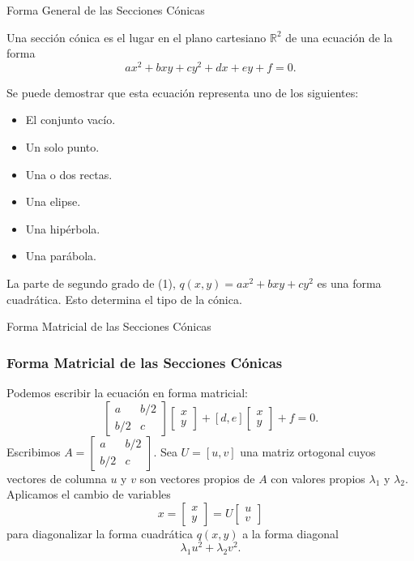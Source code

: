 \documentclass[xcolor={dvipsnames},aspectratio=169,10pt]{beamer}
\begin{document}
\begin{frame}{Forma General de las Secciones Cónicas}
  \begin{definition}
    Una sección cónica es el lugar en el plano cartesiano $\mathbb{R}^2$ de una ecuación de la forma
    \begin{equation*}
      ax^2 + bxy + cy^2 + dx + ey + f = 0. \tag{1}
    \end{equation*}
  \end{definition}
  Se puede demostrar que esta ecuación representa uno de los siguientes:
  \begin{itemize}
    \item El conjunto vacío.
    \item Un solo punto.
    \item Una o dos rectas.
    \item Una elipse.
    \item Una hipérbola.
    \item Una parábola.
\end{itemize}
  La parte de segundo grado de (1), $q(x, y) = ax^2 + bxy + cy^2$ es una forma cuadrática. Esto determina el tipo de la cónica.
\end{frame}

\begin{frame}{Forma Matricial de las Secciones Cónicas}
  \frametitle{Forma Matricial de las Secciones Cónicas}
  Podemos escribir la ecuación en forma matricial:
  \begin{equation*}
    [x, y] \begin{bmatrix} a & b/2 \\ b/2 & c \end{bmatrix} \begin{bmatrix} x \\ y \end{bmatrix} + [d, e] \begin{bmatrix} x \\ y \end{bmatrix} + f = 0.
  \end{equation*}
  Escribimos $A = \begin{bmatrix} a & b/2 \\ b/2 & c \end{bmatrix}$. Sea $U = [u, v]$ una matriz ortogonal cuyos vectores de columna $u$ y $v$ son vectores propios de $A$ con valores propios $\lambda_1$ y $\lambda_2$. Aplicamos el cambio de variables
  \begin{equation*}
    x = \begin{bmatrix} x \\ y \end{bmatrix} = U \begin{bmatrix} u \\ v \end{bmatrix}
  \end{equation*}
  para diagonalizar la forma cuadrática $q(x, y)$ a la forma diagonal
  \begin{equation*}
    \lambda_1u^2 + \lambda_2v^2.
  \end{equation*}
\end{frame}
\end{document}

